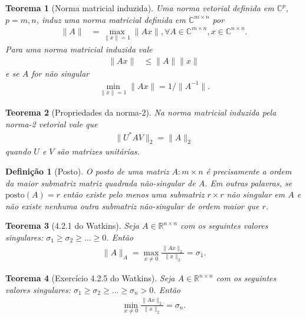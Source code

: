 \documentclass[a4paper,12pt, leqno, answers]{exam}
\newtheorem{defi}{Defini\c{c}\~{a}o}
\newtheorem{theorem}{Teorema}
\begin{document}
\thispagestyle{empty}

\newpage
\setcounter{page}{1}
\begin{theorem}[Norma matricial induzida\nocite{Meyer:2000:matrix}]
    Uma norma vetorial definida em $\mathbb{C}^p$, $p = m, n$, induz uma norma matricial definida em $\mathbb{C}^{m \times n}$ por
    \begin{align*}
        \| A \| &= \max_{\| x \| = 1} \| A x \|, \forall A \in \mathbb{C}^{m \times n}, x \in \mathbb{C}^{n \times n}.
    \end{align*}
    Para uma norma matricial induzida vale
    \begin{align*}
        \| A x \| &\leq \| A \| \| x \|
    \end{align*}
    e se $A$ for n\~{a}o singular
    \begin{align*}
        \min_{\| x \| = 1} \| A x \| = 1 / \| A^{-1} \|.
    \end{align*}
\end{theorem}
\begin{theorem}[Propriedades da norma-2\nocite{Meyer:2000:matrix}]
    Na norma matricial induzida pela norma-2 vetorial vale que
    \begin{align*}
        \| U^* A V \|_2 = \| A \|_2
    \end{align*}
    quando $U$ e $V$ s\~{a}o matrizes unit\'{a}rias.
\end{theorem}
\begin{defi}[Posto\nocite{Meyer:2000:matrix}]
    O posto de uma matriz $A : m \times n$ \'{e} precisamente a ordem da maior submatriz matriz quadrada n\~{a}o-singular de $A$. Em outras palavras, se $\mathrm{posto}(A) = r$ ent\~{a}o existe pelo menos uma submatriz $r \times r$ n\~{a}o singular em $A$ e n\~{a}o existe nenhuma outra submatriz n\~{a}o-singular de ordem maior que $r$.
\end{defi}
\begin{theorem}[4.2.1 do Watkins\nocite{Watkins:2004:fundamentals}]
    Seja $A \in \mathbb{R}^{n \times n}$ com os seguintes valores singulares: $\sigma_1 \geq \sigma_2 \geq \ldots \geq 0$. Ent\~{a}o 
    \begin{align*}
        \| A \|_A = \max_{x \neq 0} \frac{\| A x \|_2}{\| x \|_2} = \sigma_1.
    \end{align*}
\end{theorem}
\begin{theorem}[Exerc\'{i}cio 4.2.5 do Watkins\nocite{Watkins:2004:fundamentals}]
    Seja $A \in \mathbb{R}^{n \times n}$ com os seguintes valores singulares: $\sigma_1 \geq \sigma_2 \geq \ldots \geq \sigma_n > 0$. Ent\~{a}o 
    \begin{align*}
        \min_{x \neq 0} \frac{\| A x \|_2}{\| x \|_2} = \sigma_n.
    \end{align*}
\end{theorem}
\end{document}
